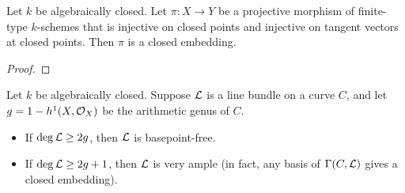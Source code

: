 \documentclass[11pt]{amsart}
\begin{document}
\begin{thm}
Let $k$ be algebraically closed. Let $\pi: X\to Y$ be a projective morphism of finite-type $k$-schemes that is injective on closed points and injective on tangent vectors at closed points. Then $\pi$ is a closed embedding.
\end{thm}

\begin{proof}

\end{proof}

\begin{thm}
Let $k$ be algebraically closed. Suppose $\mathcal{L}$ is a line bundle on a curve $C$, and let $g = 1 - h^1(X, \mathcal{O}_X)$ be the arithmetic genus of $C$.
\begin{itemize}
\item If $\deg \mathcal{L} \ge 2g$, then $\mathcal{L}$ is basepoint-free.
\item If $\deg \mathcal{L} \ge 2g+1$, then $\mathcal{L}$ is very ample (in fact, any basis of $\Gamma(C, \mathcal{L})$ gives a closed embedding).
\end{itemize}
\end{thm}
\end{document}
